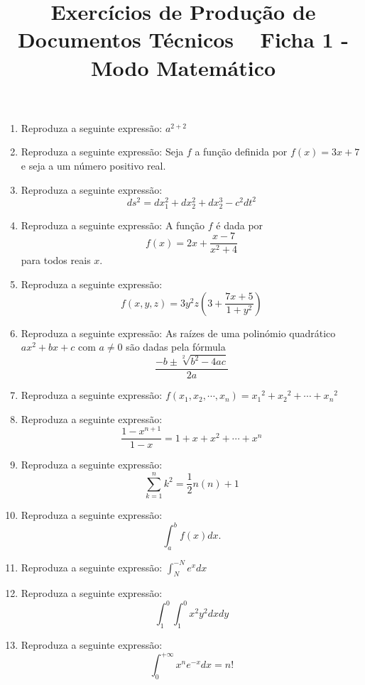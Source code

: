 \documentclass[a4paper, 11pt]{article}
\title{Exercícios de Produção de Documentos Técnicos \
\vskip 3mm
Ficha 1 - Modo Matemático}
\date{}
\begin{document}
\maketitle

\begin{enumerate}
	\item Reproduza a seguinte expressão: \vskip 3mm
		$ a^{2+2} $

	\item Reproduza a seguinte expressão:  \vskip 3mm
		Seja $ f $ a função definida por $ f (x) = 3x +7$
		e seja a um número positivo real.

	\item Reproduza a seguinte expressão:  \vskip 3mm
		\[ d
			s^2 = dx_{1}^{2} + dx_{2}^{2} + dx_{2}^{3} - c^{2}dt^{2}
		\]

	\item Reproduza a seguinte expressão:  \vskip 3mm
		A função $ f $ é dada por
		\[
			f(x)= 2x + \frac{x - 7}{x^{2} + 4}
		\]
		para todos reais $x$.

	\item Reproduza a seguinte expressão:  \vskip 3mm
		\[
			f(x, y, z) = 3y^{2}z \left( 3 + \frac{7x + 5}{1 + y^{2}} \right)
		\]

	\item Reproduza a seguinte expressão:  \vskip 3mm
		As raízes de uma polinómio quadrático $ax^{2}+bx+c$ com $a \neq 0$
		são dadas pela fórmula
	\[
		\frac{-b \pm \sqrt[2]{b^{2} - 4 ac}}{2a}
	\]

	\newpage

	\item Reproduza a seguinte expressão:  \vskip 3mm
		$f(x_1, x_2, \cdots,  x_n) = x{_1}{^2} + x{_2}{^2} + \cdots + x{_n}{^2}$

	\item Reproduza a seguinte expressão:  \vskip 3mm
		\[
			\frac{1-x^{n+1}}{1-x} = 1 + x + x^2 + \cdots + x^n
		\]

	\item Reproduza a seguinte expressão:  \vskip 3mm
		\[
			\sum_{k=1}^{n} k^2 = \frac{1}{2}n(n)+1
		\]

	\item Reproduza a seguinte expressão:  \vskip 3mm
		\[
			\int_{a}^{b} f(x)dx.
		\]

	\item Reproduza a seguinte expressão:  \vskip 3mm
	 	$\int_{N}^{-N} e^x dx$

	\item Reproduza a seguinte expressão:  \vskip 3mm
		\[
			\int_{1}^{0} \int_{1}^{0} x^2y^2dxdy
		\]

	\item Reproduza a seguinte expressão:  \vskip 3mm
		\[
			\int_{0}^{+\infty} x^n e^{-x}dx = n!
		\]

\end{enumerate}
\end{document}
